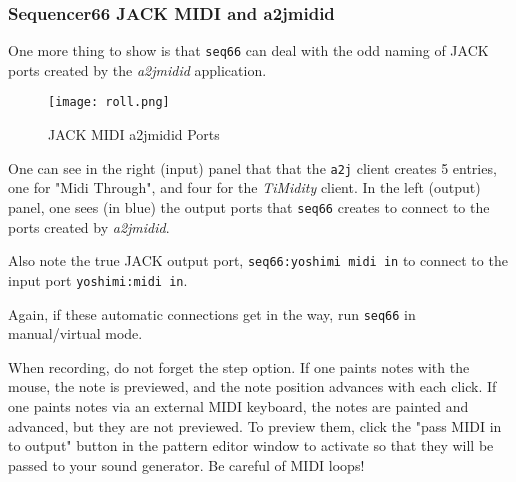 \subsubsection{Sequencer66 JACK MIDI and a2jmidid}
\label{subsubsec:seq66_jack_midi_a2jmidid}

   One more thing to show is that \texttt{seq66} can deal with the odd naming
   of JACK ports created by the \textsl{a2jmidid} application.

\begin{figure}[H]
   \centering 
   \texttt{[image: roll.png]}
   \caption{JACK MIDI a2jmidid Ports}
   \label{fig:seq66_a2jmidid_jack_midi}
\end{figure}

   One can see in the right (input) panel that that the \texttt{a2j} client
   creates 5 entries, one for "Midi Through", and four for the
   \textsl{TiMidity} client.
   In the left (output) panel, one sees (in blue) the output
   ports that \texttt{seq66} creates to connect to the ports created by
   \textsl{a2jmidid}.

   Also note the true JACK output port,
   \texttt{seq66:yoshimi midi in} to connect to the input port
   \texttt{yoshimi:midi in}.

   Again, if these automatic connections get in the way, run \texttt{seq66} in
   manual/virtual mode.

   When recording, do not forget the step option.  If one paints notes with the
   mouse, the note is previewed, and the note position advances with each
   click.  If one paints notes via an external MIDI keyboard, the notes are
   painted and advanced, but they are not previewed.  To preview them, click
   the "pass MIDI in to output" button in the pattern editor window to activate
   so that they will be passed to your sound generator.
	Be careful of MIDI loops!

